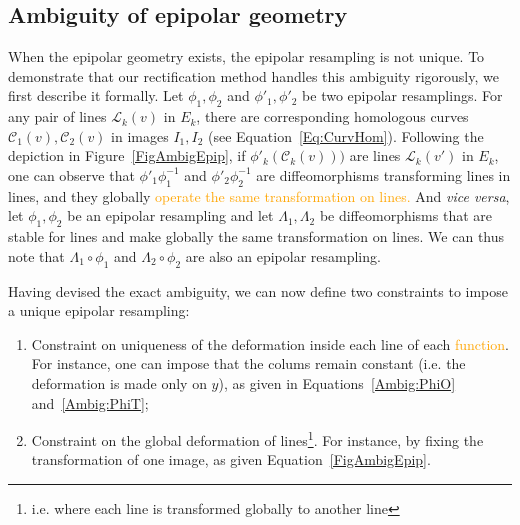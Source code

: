 \documentclass{ipol}
\newcommand{\LineE}[1]{\ensuremath{\mathcal{L}_{#1}}}
\newcommand{\LineK}{\LineE{k}}
\newcommand{\CurveE}[1]{\ensuremath{\mathcal{C}_{#1}}}
\newcommand{\CurveO}{\CurveE{1}}
\newcommand{\CurveT}{\CurveE{2}}
\newcommand{\CurveK}{\CurveE{k}}
\newcommand{\er}[1]{\textcolor{orange}{#1}}
\begin{document}
\subsection{Ambiguity of epipolar geometry}

When the epipolar geometry exists, the epipolar resampling is not unique. To demonstrate that our rectification method handles this ambiguity rigorously, we first describe it formally. Let $\phi_1,\phi_2$ and  $\phi'_1,\phi'_2$ be two   epipolar resamplings.
For any pair of lines $\LineK(v)$ in $E_k$, there are corresponding 
homologous curves $\CurveO(v),\CurveT(v)$  in images 
$I_1,I_2$ (see Equation~\ref{Eq:CurvHom}). Following the depiction in Figure~\ref{FigAmbigEpip}, if $\phi'_k(\CurveK(v)))$
are  lines $\LineK(v')$ in $E_k$, one can observe that $\phi'_1 \phi_1^{-1}$  and $\phi'_2 \phi_2^{-1}$ are diffeomorphisms transforming lines in lines, and they globally \er{operate the same transformation on lines.}
And \textit{vice versa}, let  $\phi_1,\phi_2$ be an epipolar resampling and let $\Lambda_1,\Lambda_2$ 
be diffeomorphisms  that are stable for lines and make globally the same transformation on lines. We can thus note that $\Lambda_1 \circ \phi_1$ and  $\Lambda_2 \circ \phi_2$ are also an epipolar resampling.


Having devised the exact ambiguity, we can now define two constraints to impose a unique epipolar resampling: 
\begin{enumerate}
\item Constraint on uniqueness of the deformation
inside each line of each \er{function}. For instance, one can impose that the colums remain constant (i.e.
the deformation is made only on  $y$), as given in Equations~\ref{Ambig:PhiO}
and~\ref{Ambig:PhiT};
\item Constraint on the global deformation of lines\footnote{i.e. where each line
is transformed globally to another line}. For instance, by fixing the transformation of one image, as given Equation~\ref{FigAmbigEpip}.
\end{enumerate}
 
\end{document}
